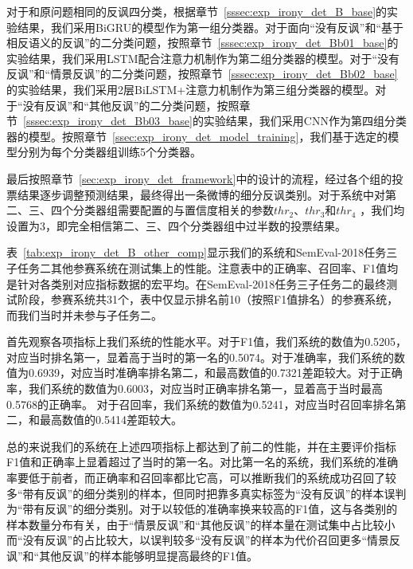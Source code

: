 对于和原问题相同的反讽四分类，根据章节~\ref{sssec:exp_irony_det_B_base}的实验结果，我们采用BiGRU的模型作为第一组分类器。对于面向“没有反讽”和“基于相反语义的反讽”的二分类问题，按照章节~\ref{sssec:exp_irony_det_Bb01_base}的实验结果，我们采用LSTM配合注意力机制作为第二组分类器的模型。对于“没有反讽”和“情景反讽”的二分类问题，按照章节~\ref{sssec:exp_irony_det_Bb02_base}的实验结果，我们采用2层BiLSTM+注意力机制作为第三组分类器的模型。对于“没有反讽”和“其他反讽”的二分类问题，按照章节~\ref{sssec:exp_irony_det_Bb03_base}的实验结果，我们采用CNN作为第四组分类器的模型。按照章节~\ref{ssec:exp_irony_det_model_training}，我们基于选定的模型分别为每个分类器组训练5个分类器。

最后按照章节~\ref{sec:exp_irony_det_framework}中的设计的流程，经过各个组的投票结果逐步调整预测结果，最终得出一条微博的细分反讽类别。对于系统中对第二、三、四个分类器组需要配置的与置信度相关的参数$thr_2$、$thr_3$和$thr_4$ ，我们均设置为3，即完全相信第二、三、四个分类器组中过半数的投票结果。

表~\ref{tab:exp_irony_det_B_other_comp}显示我们的系统和SemEval-2018任务三子任务二其他参赛系统在测试集上的性能。注意表中的正确率、召回率、F1值均是针对各类别对应指标数据的宏平均。在SemEval-2018任务三子任务二的最终测试阶段，参赛系统共31个，表中仅显示排名前10（按照F1值排名）的参赛系统，而我们当时并未参与子任务二。
 
首先观察各项指标上我们系统的性能水平。对于F1值，我们系统的数值为0.5205，对应当时排名第一，显着高于当时的第一名的0.5074。对于准确率，我们系统的数值为0.6939，对应当时准确率排名第二，和最高数值的0.7321差距较大。对于正确率，我们系统的数值为0.6003，对应当时正确率排名第一，显着高于当时最高0.5768的正确率。
对于召回率，我们系统的数值为0.5241，对应当时召回率排名第二，和最高数值的0.5414差距较大。

总的来说我们的系统在上述四项指标上都达到了前二的性能，并在主要评价指标F1值和正确率上显着超过了当时的第一名。对比第一名的系统，我们系统的准确率要低于前者，而正确率和召回率都比它高，可以推断我们的系统成功召回了较多“带有反讽”的细分类别的样本，但同时把靠多真实标签为“没有反讽”的样本误判为“带有反讽”的细分类别。对于以较低的准确率换来较高的F1值，这与各类别的样本数量分布有关，由于“情景反讽”和“其他反讽”的样本量在测试集中占比较小而“没有反讽”的占比较大，以误判较多“没有反讽”的样本为代价召回更多“情景反讽”和“其他反讽”的样本能够明显提高最终的F1值。

